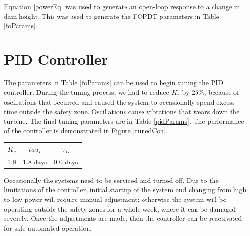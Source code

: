 \documentclass{article}
\begin{document}
\begin{multicols*}{2}
        Equation \ref{powerEq} was used to generate an open-loop response to a change in dam height. This was used to generate the FOPDT parameters in Table \ref{foParams}.
        
            
        \section{PID Controller}
    
        The parameters in Table \ref{foParams} can be used to begin tuning the PID controller.  During the tuning process, we had to reduce $K_p$ by 25\%, because of oscillations that occurred and caused the system to occasionally spend excess time outside the safety zone. Oscillations cause vibrations that wears down the turbine. The final tuning parameters are in Table \ref{pidParams}. The performance of the controller is demonstrated in Figure \ref{tunedCon}.

        \begin{minipage}{0.9\columnwidth}
            \label{pidParams}
            \vspace{-1ex}
            \begin{center}
            \begin{tabular}{ccc}
                    \toprule
                    $K_c$ & $tau_I$ & $\tau_D$ \\
                    \midrule
                     1.8 & 1.8 days & 0.0 days
                \end{tabular}
            \end{center}
        \end{minipage}

        Occasionally the systems need to be serviced and turned off.  Due to the limitations of the controller, initial startup of the system and changing from high to low power will require manual adjustment; otherwise the system will be operating outside the safety zones for a whole week, where it can be damaged severely.  Once the adjustments are made, then the controller can be reactivated for safe automated operation.


\end{multicols*}
\end{document}
